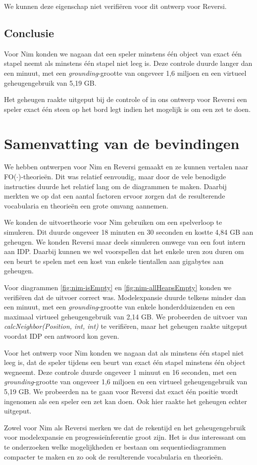We kunnen deze eigenschap niet verifi\"eren voor dit ontwerp voor Reversi.

\subsection{Conclusie}

Voor Nim konden we nagaan dat een speler minstens \'e\'en object van exact \'e\'en stapel neemt als minstens \'e\'en stapel niet leeg is. Deze controle duurde langer dan een minuut, met een \textit{grounding}-grootte van ongeveer 1,6 miljoen en een virtueel geheugengebruik van 5,19 GB.

Het geheugen raakte uitgeput bij de controle of in ons ontwerp voor Reversi een speler exact \'e\'en steen op het bord legt indien het mogelijk is om een zet te doen.

\section{Samenvatting van de bevindingen}
We hebben ontwerpen voor Nim en Reversi gemaakt en ze kunnen vertalen naar FO($\cdot$)-theorie\"en. Dit was relatief eenvoudig, maar door de vele benodigde instructies duurde het relatief lang om de diagrammen te maken. Daarbij merkten we op dat een aantal factoren ervoor zorgen dat de resulterende vocabularia en theorie\"en een grote omvang aannemen.

We konden de uitvoertheorie voor Nim gebruiken om een spelverloop te simuleren. Dit duurde ongeveer 18 minuten en 30 seconden en kostte 4,84 GB aan geheugen. We konden Reversi maar deels simuleren omwege van een fout intern aan IDP. Daarbij kunnen we wel voorspellen dat het enkele uren zou duren om een beurt te spelen met een kost van enkele tientallen aan gigabytes aan geheugen.

Voor diagrammen \ref{fig:nim-isEmpty} en \ref{fig:nim-allHeapsEmpty} konden we verifi\"eren dat de uitvoer correct was. Modelexpansie duurde telkens minder dan een minuut, met een \textit{grounding}-grootte van enkele honderdduizenden en een maximaal virtueel geheugengebruik van 2,14 GB. We probeerden de uitvoer van \textit{calcNeighbor(Position, int, int)} te verifi\"eren, maar het geheugen raakte uitgeput voordat IDP een antwoord kon geven.

Voor het ontwerp voor Nim konden we nagaan dat als minstens \'e\'en stapel niet leeg is, dat de speler tijdens een beurt van exact \'e\'en stapel minstens \'e\'en object wegneemt. Deze controle duurde ongeveer 1 minuut en 16 seconden, met een \textit{grounding}-grootte van ongeveer 1,6 miljoen en een virtueel geheugengebruik van 5,19 GB. We probeerden na te gaan voor Reversi dat exact \'e\'en positie wordt ingenomen als een speler een zet kan doen. Ook hier raakte het geheugen echter uitgeput.

Zowel voor Nim als Reversi merken we dat de rekentijd en het geheugengebruik voor modelexpansie en progressie\"inferentie groot zijn. Het is dus interessant om te onderzoeken welke mogelijkheden er bestaan om sequentiediagrammen compacter te maken en zo ook de resulterende vocabularia en theorie\"en.